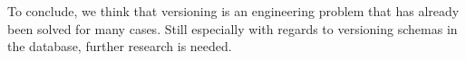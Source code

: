 To conclude, we think that versioning is an engineering problem that has already been solved for many cases. Still especially with regards to versioning schemas in the database, further research is needed.

%
%
%

